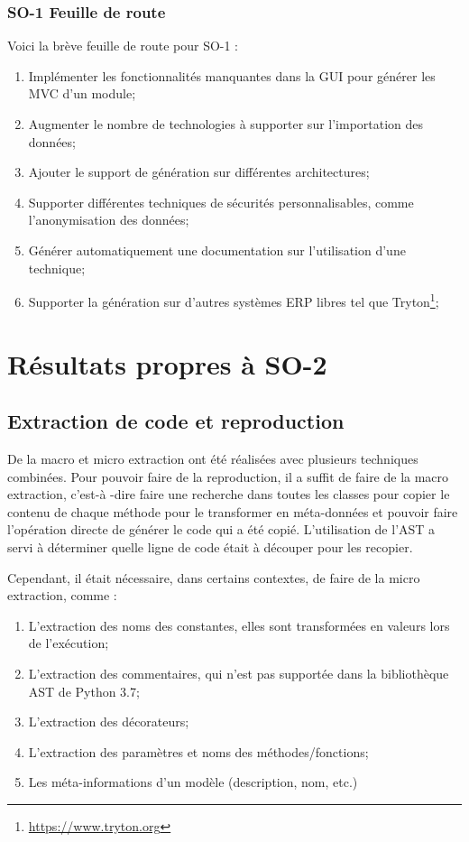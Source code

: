 \subsubsection{SO-1 Feuille de route}
Voici la brève feuille de route pour SO-1 :
\begin{enumerate}
    \item Implémenter les fonctionnalités manquantes dans la GUI pour générer les MVC d’un module;
    \item Augmenter le nombre de technologies à supporter sur l'importation des données;
    \item Ajouter le support de génération sur différentes architectures;
    \item Supporter différentes techniques de sécurités personnalisables, comme l’anonymisation des données;
    \item Générer automatiquement une documentation sur l’utilisation d’une technique;
    \item Supporter la génération sur d’autres systèmes ERP libres tel que Tryton\footnote{\url{https://www.tryton.org}};
\end{enumerate}

\section{Résultats propres à SO-2}

\subsection {Extraction de code et reproduction}

De la macro et micro extraction ont été réalisées avec plusieurs techniques combinées. Pour pouvoir faire de la reproduction, il a suffit de faire de la macro extraction, c'est-à -dire faire une recherche dans toutes les classes pour copier le contenu de chaque méthode pour le transformer en méta-données et pouvoir faire l’opération directe de générer le code qui a été copié. L’utilisation de l’AST a servi à déterminer quelle ligne de code était à découper pour les recopier.

Cependant, il était nécessaire, dans certains contextes, de faire de la micro extraction, comme : 
\begin{enumerate}
    \item L’extraction des noms des constantes, elles sont transformées en valeurs lors de l’exécution;
    \item L’extraction des commentaires, qui n’est pas supportée dans la bibliothèque AST de Python 3.7;
    \item L’extraction des décorateurs;
    \item L’extraction des paramètres et noms des méthodes/fonctions;
    \item Les méta-informations d’un modèle (description, nom, etc.)
\end{enumerate}

